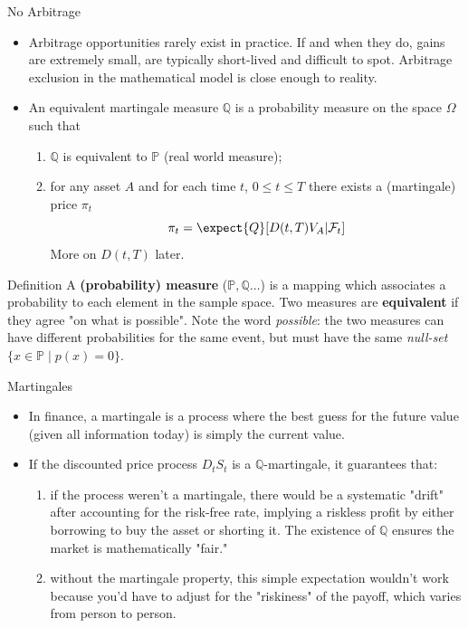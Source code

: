 \documentclass{beamer}
\begin{document}
	\begin{frame}{No Arbitrage}
		\begin{itemize}
			\item Arbitrage opportunities rarely exist in practice. If and when they do, gains are extremely small, are typically short-lived and difficult to spot. \textcolor{maincolor}{Arbitrage exclusion in the mathematical model is close enough to reality}.
			\item An \textcolor{maincolor}{equivalent martingale measure} $\mathbb{Q}$ is a probability measure on the space $\Omega$ such that
			\begin{enumerate}
				\item $\mathbb{Q}$ is equivalent to $\mathbb{P}$ (real world measure);
				\item for any asset $A$ and for each time $t$, $0\le t\le T$ there exists a (martingale) price $\pi_t$
				\begin{equation*}
					\pi_t = \expect{Q}[D(t,T)V_A|\mathcal{F}_t]
				\end{equation*}
				More on $D(t, T)$ later.
			\end{enumerate}
		\end{itemize}
		\begin{block}{Definition}
			A \textbf{(probability) measure} ($\mathbb{P}, \mathbb{Q}\ldots$) is a mapping which associates a probability to each element in the sample space. Two measures are \textbf{equivalent} if they agree "on what is possible". Note the word \emph{possible}: the two measures can have different probabilities for the same event, but must have the same \emph{null-set} $\{x\in {\mathbb{P}}\mid p (x)=0\}$.
		\end{block}
	\end{frame}

	\begin{frame}{Martingales}
	\begin{itemize}
		\item In finance, a martingale is a process where the best guess for the future value (given all information today) is simply the current value.
		\item If the discounted price process $D_t S_t$ is a $\mathbb{Q}$-martingale, it guarantees that:
		\begin{enumerate}
			\item if the process weren't a martingale, there would be a systematic "drift" after accounting for the risk-free rate, implying a riskless profit by either borrowing to buy the asset or shorting it. The existence of $\mathbb{Q}$ ensures the market is mathematically "fair."
			\item without the martingale property, this simple expectation wouldn't work because you'd have to adjust for the "riskiness" of the payoff, which varies from person to person.
		\end{enumerate}
	\end{itemize}
	\end{frame}
\end{document}
